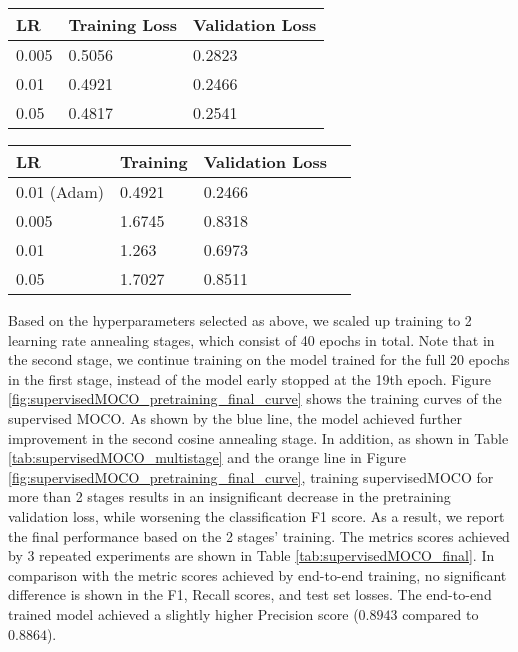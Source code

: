 \documentclass[12pt,twoside]{report}
\begin{document}
\begin{minipage}[c]{0.49\textwidth}
    \centering
    \begin{tabular}{lll}
    \toprule
    LR & Training Loss & Validation Loss \\
    \midrule
    0.005 & 0.5056 & 0.2823 \\
    0.01 & 0.4921 & 0.2466 \\
    0.05 & 0.4817 & 0.2541 \\
    \bottomrule
    \end{tabular}
    \captionsetup{type=table}
    \label{tab:supervised_moco_lr}
\end{minipage}
\begin{minipage}[c]{0.5\textwidth}
    \centering
    \begin{tabular}{llll}
    \toprule
    LR & Training & Validation Loss \\
    \midrule
    0.01 (Adam) & 0.4921 & 0.2466 \\
    \midrule
    0.005 & 1.6745 & 0.8318 \\
    0.01  & 1.263 & 0.6973 \\
    0.05  & 1.7027 & 0.8511 \\
    \bottomrule
    \end{tabular}
    \captionsetup{type=table}
    \label{tab:supervised_moco_optimizer}
\end{minipage}

Based on the hyperparameters selected as above, we scaled up training to 2 learning rate annealing stages, which consist of 40 epochs in total. Note that in the second stage, we continue training on the model trained for the full 20 epochs in the first stage, instead of the model early stopped at the 19th epoch. Figure \ref{fig:supervisedMOCO_pretraining_final_curve} shows the training curves of the supervised MOCO. As shown by the blue line, the model achieved further improvement in the second cosine annealing stage. In addition, as shown in Table \ref{tab:supervisedMOCO_multistage} and the orange line in Figure \ref{fig:supervisedMOCO_pretraining_final_curve}, training supervisedMOCO for more than 2 stages results in an insignificant decrease in the pretraining validation loss, while worsening the classification F1 score. As a result, we report the final performance based on the 2 stages' training. The metrics scores achieved by 3 repeated experiments are shown in Table \ref{tab:supervisedMOCO_final}. In comparison with the metric scores achieved by end-to-end training, no significant difference is shown in the F1, Recall scores, and test set losses. The end-to-end trained model achieved a slightly higher Precision score ($0.8943$ compared to $0.8864$). \\
\end{document}
